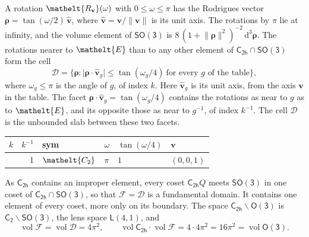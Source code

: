 \documentclass[10pt,a4paper]{article}
\numberwithin{equation}{section}
\newcommand{\eltfont}[1]{{\let\sigma\eltsigma\mathelt{#1}}}
\newcommand{\grp}[1]{\mathsf{#1}}
\newcommand{\cls}[1]{\eltfont{#1}}
\newcommand{\elt}[1]{\eltfont{#1}}
\newcommand{\dirvec}[3]{(#1, #2, #3)}
\newcommand{\unitaxis}{\hat{\mathbf{v}}}
\newcommand{\vv}{\mathbf{v}}
\newcommand{\diff}{\mathrm{d}}
\newcommand{\vol}{\operatorname{vol}}
\newcommand{\rodrigues}{\boldsymbol{\rho}}
\newcommand{\fcell}{\mathcal{D}}
\newcommand{\fdomain}{\mathcal{F}}
\newcommand{\lensspace}[2]{\mathsf{L}(#1, #2)}
\begin{document}
\leavevmode\label{n:vector.rodrigues}\label{n:vector.unitaxis}A rotation $\elt{R_{\vv}}(\omega)$ with $0 \le \omega \le \pi$ has the Rodrigues vector $\rodrigues = \tan(\omega/2)\,\unitaxis$, where $\unitaxis = \vv/\lVert\vv\rVert$ is its unit axis. The rotations by $\pi$ lie at infinity, and the volume element of \href{SO3.pdf}{$\grp{SO(3)}$} is $8\,(1 + \lVert\rodrigues\rVert^2)^{-2}\,\diff^3\rodrigues$.
\leavevmode\label{n:set.cell}The rotations nearer to $\elt{E}$ than to any other element of $\grp{C_{2h}} \cap \grp{SO(3)}$ form the cell
\begin{equation}\label{e:cell}\fcell = \bigl\{\rodrigues : \lvert\rodrigues\cdot\unitaxis_g\rvert \le \tan(\omega_g/4)\ \text{for every $g$ of the table}\bigr\},\end{equation}
where $\omega_g \le \pi$ is the angle of $g$, of index $k$. Here $\unitaxis_g$ is its unit axis, from the axis $\vv$ in the table. The facet $\rodrigues\cdot\unitaxis_g = \tan(\omega_g/4)$ contains the rotations as near to $g$ as to $\elt{E}$, and its opposite those as near to $g^{-1}$, of index $k^{-1}$. The cell $\fcell$ is the unbounded slab between these two facets.
{\small\begin{longtable}{@{}rrllll@{}}\toprule
$k$ & $k^{-1}$ & sym & $\omega$ & $\tan(\omega/4)$ & $\vv$\\\midrule\endhead
\bottomrule\endfoot\endlastfoot
1 & 1 & $\cls{C_{2}}$ & $\pi$ & $1$ & $\dirvec{0}{0}{1}$\\
\bottomrule\end{longtable}}

\leavevmode\label{n:set.fundamental}As $\grp{C_{2h}}$ contains an improper element, every coset $\grp{C_{2h}}Q$ meets \href{SO3.pdf}{$\grp{SO(3)}$} in one coset of $\grp{C_{2h}} \cap \grp{SO(3)}$, so that $\fdomain = \fcell$ is a fundamental domain. It contains one element of every coset, more only on its boundary.
\leavevmode\label{n:set.lens}The space $\grp{C_{2h}}\backslash\grp{O(3)}$ is $\grp{C_{2}}\backslash\grp{SO(3)}$, the lens space $\lensspace{4}{1}$, and
\begin{equation}\label{e:volume}\vol\fdomain = \vol\fcell = 4\pi^2,\qquad \vol\grp{C_{2h}}\cdot\vol\fdomain = 4\cdot 4\pi^2 = 16\pi^2 = \vol\grp{O(3)}.\end{equation}
\end{document}
